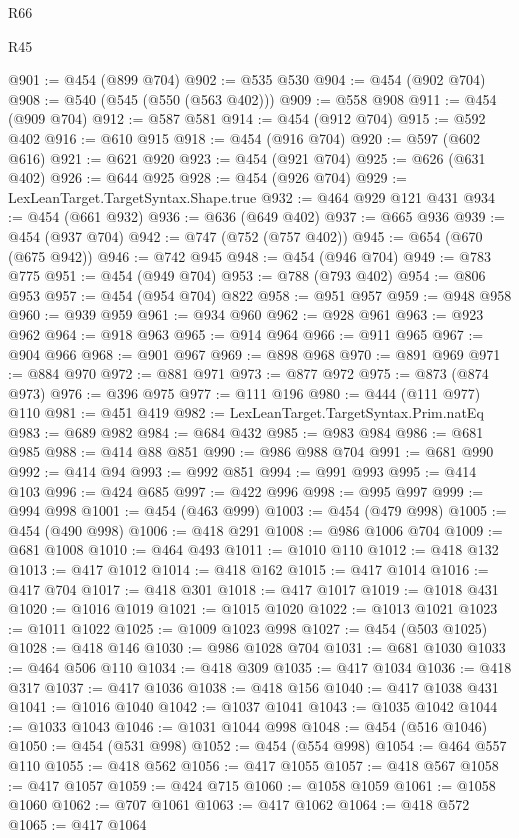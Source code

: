 \begin{lexlean}{R66}
\begin{lexlean}{R45}
\begin{coremodule}
{{{{{{{{{{{{{{{{{{{{{{{{{{{{{{{{{{{{{{{{{{{{{{{{{{{{{{{{{{{{{{{{{{{{{{{{{{{{{{{{{{{{{{{{{{{@901 := @454 (@899 @704)
@902 := @535 @530
@904 := @454 (@902 @704)
@908 := @540 (@545 (@550 (@563 @402)))
@909 := @558 @908
@911 := @454 (@909 @704)
@912 := @587 @581
@914 := @454 (@912 @704)
@915 := @592 @402
@916 := @610 @915
@918 := @454 (@916 @704)
@920 := @597 (@602 @616)
@921 := @621 @920
@923 := @454 (@921 @704)
@925 := @626 (@631 @402)
@926 := @644 @925
@928 := @454 (@926 @704)
@929 := LexLeanTarget.TargetSyntax.Shape.true
@932 := @464 @929 @121 @431
@934 := @454 (@661 @932)
@936 := @636 (@649 @402)
@937 := @665 @936
@939 := @454 (@937 @704)
@942 := @747 (@752 (@757 @402))
@945 := @654 (@670 (@675 @942))
@946 := @742 @945
@948 := @454 (@946 @704)
@949 := @783 @775
@951 := @454 (@949 @704)
@953 := @788 (@793 @402)
@954 := @806 @953
@957 := @454 (@954 @704) @822
@958 := @951 @957
@959 := @948 @958
@960 := @939 @959
@961 := @934 @960
@962 := @928 @961
@963 := @923 @962
@964 := @918 @963
@965 := @914 @964
@966 := @911 @965
@967 := @904 @966
@968 := @901 @967
@969 := @898 @968
@970 := @891 @969
@971 := @884 @970
@972 := @881 @971
@973 := @877 @972
@975 := @873 (@874 @973)
@976 := @396 @975
@977 := @111 @196
@980 := @444 (@111 @977) @110
@981 := @451 @419
@982 := LexLeanTarget.TargetSyntax.Prim.natEq
@983 := @689 @982
@984 := @684 @432
@985 := @983 @984
@986 := @681 @985
@988 := @414 @88 @851
@990 := @986 @988 @704
@991 := @681 @990
@992 := @414 @94
@993 := @992 @851
@994 := @991 @993
@995 := @414 @103
@996 := @424 @685
@997 := @422 @996
@998 := @995 @997
@999 := @994 @998
@1001 := @454 (@463 @999)
@1003 := @454 (@479 @998)
@1005 := @454 (@490 @998)
@1006 := @418 @291
@1008 := @986 @1006 @704
@1009 := @681 @1008
@1010 := @464 @493
@1011 := @1010 @110
@1012 := @418 @132
@1013 := @417 @1012
@1014 := @418 @162
@1015 := @417 @1014
@1016 := @417 @704
@1017 := @418 @301
@1018 := @417 @1017
@1019 := @1018 @431
@1020 := @1016 @1019
@1021 := @1015 @1020
@1022 := @1013 @1021
@1023 := @1011 @1022
@1025 := @1009 @1023 @998
@1027 := @454 (@503 @1025)
@1028 := @418 @146
@1030 := @986 @1028 @704
@1031 := @681 @1030
@1033 := @464 @506 @110
@1034 := @418 @309
@1035 := @417 @1034
@1036 := @418 @317
@1037 := @417 @1036
@1038 := @418 @156
@1040 := @417 @1038 @431
@1041 := @1016 @1040
@1042 := @1037 @1041
@1043 := @1035 @1042
@1044 := @1033 @1043
@1046 := @1031 @1044 @998
@1048 := @454 (@516 @1046)
@1050 := @454 (@531 @998)
@1052 := @454 (@554 @998)
@1054 := @464 @557 @110
@1055 := @418 @562
@1056 := @417 @1055
@1057 := @418 @567
@1058 := @417 @1057
@1059 := @424 @715
@1060 := @1058 @1059
@1061 := @1058 @1060
@1062 := @707 @1061
@1063 := @417 @1062
@1064 := @418 @572
@1065 := @417 @1064
}}}}}}}}}}}}}}}}}}}}}}}}}}}}}}}}}}}}}}}}}}}}}}}}}}}}}}}}}}}}}}}}}}}}}}}}}}}}}}}}}}}}}}}}}}}
\end{coremodule}
\end{lexlean}
\end{lexlean}
